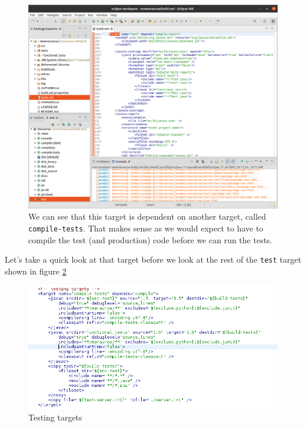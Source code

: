 \documentclass[
]{book}
\begin{document}
\begin{figure}

{\centering \includegraphics[width=1\linewidth]{images/3.1.1showTestTargetInBuildScript} 

}

\caption{We can see that this target is dependent on another target, called \texttt{compile-tests}. That makes sense as we would expect to have to compile the test (and production) code before we can run the tests.}\label{fig:showTestTargetInBuildScript-fig}
\end{figure}



Let's take a quick look at that target before we look at the rest of the \texttt{test} target shown in figure \ref{fig:compileTestsTargetJustCode-fig}

\begin{figure}

{\centering \includegraphics[width=1\linewidth]{images/3.1compileTestsTargetJustCode} 

}

\caption{Testing targets}\label{fig:compileTestsTargetJustCode-fig}
\end{figure}
\end{document}

